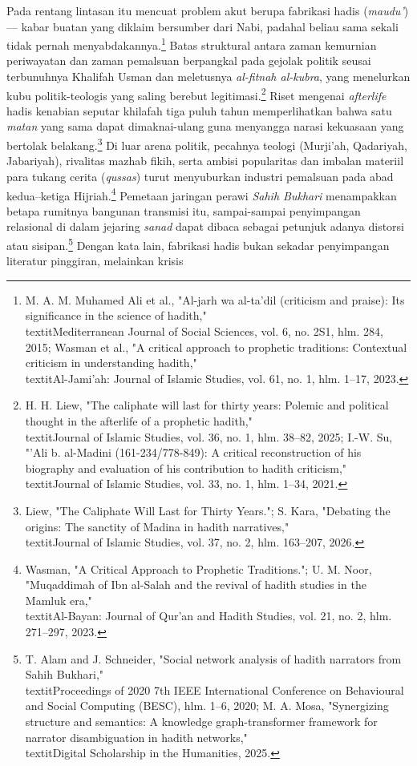 Pada rentang lintasan itu mencuat problem akut berupa fabrikasi hadis (\textit{maudu'}) --- kabar buatan yang diklaim bersumber dari Nabi, padahal beliau sama sekali tidak pernah menyabdakannya.\footnote{M. A. M. Muhamed Ali et al., "Al-jarh wa al-ta'dil (criticism and praise): Its significance in the science of hadith," \\textit{Mediterranean Journal of Social Sciences}, vol. 6, no. 2S1, hlm. 284, 2015; Wasman et al., "A critical approach to prophetic traditions: Contextual criticism in understanding hadith," \\textit{Al-Jami'ah: Journal of Islamic Studies}, vol. 61, no. 1, hlm. 1--17, 2023.} Batas struktural antara zaman kemurnian periwayatan dan zaman pemalsuan berpangkal pada gejolak politik seusai terbunuhnya Khalifah Usman dan meletusnya \textit{al-fitnah al-kubra}, yang menelurkan kubu politik-teologis yang saling berebut legitimasi.\footnote{H. H. Liew, "The caliphate will last for thirty years: Polemic and political thought in the afterlife of a prophetic hadith," \\textit{Journal of Islamic Studies}, vol. 36, no. 1, hlm. 38--82, 2025; I.-W. Su, "'Ali b. al-Madini (161-234/778-849): A critical reconstruction of his biography and evaluation of his contribution to hadith criticism," \\textit{Journal of Islamic Studies}, vol. 33, no. 1, hlm. 1--34, 2021.} Riset mengenai \textit{afterlife} hadis kenabian seputar khilafah tiga puluh tahun memperlihatkan bahwa satu \textit{matan} yang sama dapat dimaknai-ulang guna menyangga narasi kekuasaan yang bertolak belakang.\footnote{Liew, "The Caliphate Will Last for Thirty Years."; S. Kara, "Debating the origins: The sanctity of Madina in hadith narratives," \\textit{Journal of Islamic Studies}, vol. 37, no. 2, hlm. 163--207, 2026.} Di luar arena politik, pecahnya teologi (Murji'ah, Qadariyah, Jabariyah), rivalitas mazhab fikih, serta ambisi popularitas dan imbalan materiil para tukang cerita (\textit{qussas}) turut menyuburkan industri pemalsuan pada abad kedua--ketiga Hijriah.\footnote{Wasman, "A Critical Approach to Prophetic Traditions."; U. M. Noor, "Muqaddimah of Ibn al-Salah and the revival of hadith studies in the Mamluk era," \\textit{Al-Bayan: Journal of Qur'an and Hadith Studies}, vol. 21, no. 2, hlm. 271--297, 2023.} Pemetaan jaringan perawi \textit{Sahih Bukhari} menampakkan betapa rumitnya bangunan transmisi itu, sampai-sampai penyimpangan relasional di dalam jejaring \textit{sanad} dapat dibaca sebagai petunjuk adanya distorsi atau sisipan.\footnote{T. Alam and J. Schneider, "Social network analysis of hadith narrators from Sahih Bukhari," \\textit{Proceedings of 2020 7th IEEE International Conference on Behavioural and Social Computing (BESC)}, hlm. 1--6, 2020; M. A. Mosa, "Synergizing structure and semantics: A knowledge graph-transformer framework for narrator disambiguation in hadith networks," \\textit{Digital Scholarship in the Humanities}, 2025.} Dengan kata lain, fabrikasi hadis bukan sekadar penyimpangan literatur pinggiran, melainkan krisis 